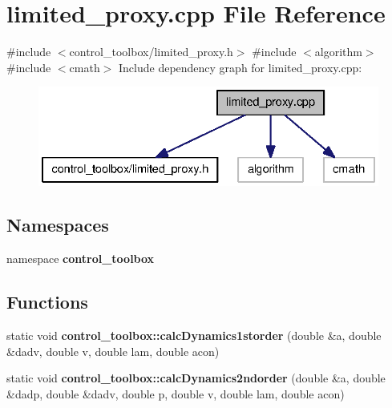 \section{limited\-\_\-proxy.\-cpp \-File \-Reference}
\label{limited__proxy_8cpp}
{\ttfamily \#include $<$control\-\_\-toolbox/limited\-\_\-proxy.\-h$>$}\*
{\ttfamily \#include $<$algorithm$>$}\*
{\ttfamily \#include $<$cmath$>$}\*
\-Include dependency graph for limited\-\_\-proxy.\-cpp\-:
\nopagebreak
\begin{figure}[H]
\begin{center}
\leavevmode
\includegraphics[width=332pt]{limited__proxy_8cpp__incl}
\end{center}
\end{figure}
\subsection*{\-Namespaces}
\begin{DoxyCompactItemize}
\item 
namespace {\bf control\-\_\-toolbox}
\end{DoxyCompactItemize}
\subsection*{\-Functions}
\begin{DoxyCompactItemize}
\item 
static void {\bf control\-\_\-toolbox\-::calc\-Dynamics1storder} (double \&a, double \&dadv, double v, double lam, double acon)
\item 
static void {\bf control\-\_\-toolbox\-::calc\-Dynamics2ndorder} (double \&a, double \&dadp, double \&dadv, double p, double v, double lam, double acon)
\end{DoxyCompactItemize}
